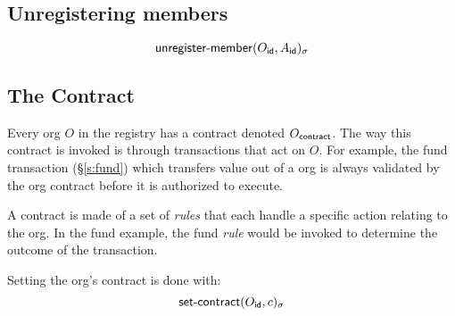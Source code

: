 \subsection{Unregistering members}
\[
    \operatorname{\mathsf{unregister-member}}\lparen O_{\mathsf{id}}, A_{\mathsf{id}}\rparen_\sigma
\]


\subsection{The Contract}
Every org $O$ in the registry has a contract denoted $O_{\mathsf{contract}}$.
The way this contract is invoked is through transactions that act on $O$. For
example, the \textsf{fund} transaction (\S\ref{s:fund}) which transfers value
out of a org is always validated by the org contract before it
is authorized to execute.

A contract is made of a set of \emph{rules} that each handle a specific action
relating to the org. In the \textsf{fund} example, the \textsf{fund}
\emph{rule} would be invoked to determine the outcome of the transaction.

Setting the org's contract is done with:
\[
    \operatorname{\mathsf{set-contract}}\lparen O_{\mathsf{id}}, c\rparen_\sigma
\]


